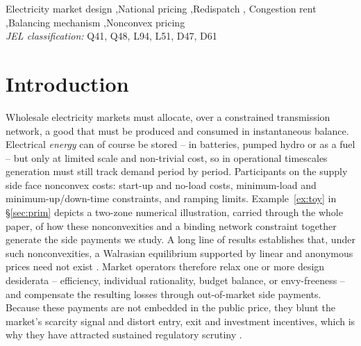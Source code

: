 \documentclass[review,3p,times]{elsarticle}
\theoremstyle{plain}
\theoremstyle{definition}
\begin{document}
\begin{frontmatter}
\begin{abstract}
notifications and flagged bid-offer acceptances), and validate the figure
against the published constraint cost. The cost of national pricing is, to first
order, the same congestion rent: under nodal pricing the system operator would
\emph{collect} it as merchandising surplus (and could rebate it to consumers),
whereas under national pricing it is instead \emph{paid out} to generators as
redispatch and socialised across demand. Measured directly from settlement
records, this realised B6 congestion rent is of order $\pounds1.1$bn in FY 2024/25
-- about $59\%$ of GB system constraint costs and tracking the independent
published daily series almost exactly (correlation $0.97$); the underlying
$9.55$\,TWh of Scottish-wind curtailment matches independently reported volumes.
Table~\ref{tab:results} summarises the per-period magnitude on the B6 boundary.
\end{abstract}


\begin{keyword}
Electricity market design \sep National pricing \sep Redispatch \sep
Congestion rent \sep Balancing mechanism \sep Nonconvex pricing \\
\textit{JEL classification:} Q41, Q48, L94, L51, D47, D61
\end{keyword}

\end{frontmatter}

\section{Introduction}
\label{sec:intro}

Wholesale electricity markets must allocate, over a constrained transmission
network, a good that must be produced and consumed in instantaneous balance.
Electrical \emph{energy} can of course be stored -- in batteries, pumped hydro or
as a fuel -- but only at limited scale and non-trivial cost, so in operational
timescales generation must still track demand period by period. Participants on the supply side face nonconvex costs:
start-up and no-load costs, minimum-load and minimum-up/down-time constraints,
and ramping limits. Example~\ref{ex:toy} in \S\ref{sec:prim} depicts a two-zone
numerical illustration, carried through the whole paper, of how these
nonconvexities and a binding network constraint together generate the
side payments we study. A long line of results
establishes that, under such
nonconvexities, a Walrasian equilibrium supported by linear and anonymous prices
need not exist \citep{oneill2005, bichlerwaldherr2017, bikhchandaniostroy2002}.
Market operators therefore relax one or more design desiderata -- efficiency,
individual rationality, budget balance, or envy-freeness -- and compensate the
resulting losses through out-of-market side payments. Because these payments are
not embedded in the public price, they blunt the market's scarcity signal and
distort entry, exit and investment incentives, which is why they have attracted
sustained regulatory scrutiny \citep{liberopoulos2016, bichler2022}.
\end{document}
